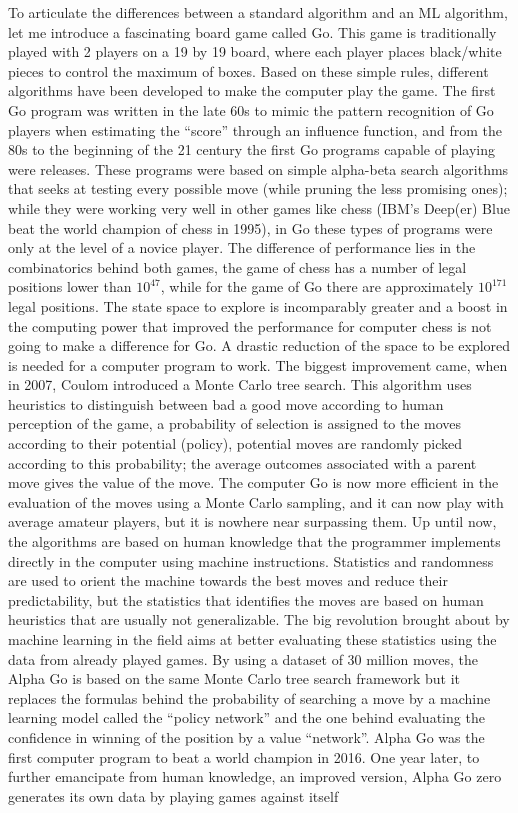 \documentclass[main]{subfiles}
\begin{document}
To articulate the differences between a standard algorithm and an ML algorithm, let me introduce a fascinating board game called Go. This game is traditionally played with 2 players on a 19 by 19 board, where each player places black/white pieces to control the maximum of boxes. Based on these simple rules, different algorithms have been developed to make the computer play the game. The first Go program was written in the late 60s to mimic the pattern recognition of Go players when estimating the ``score'' through an influence function,\autocite{zobrist1970feature} and from the 80s to the beginning of the 21 century the first Go programs capable of playing were releases. These programs were based on simple alpha-beta search algorithms that seeks at testing every possible move (while pruning the less promising ones); while they were working very well in other games like chess (IBM's Deep(er) Blue beat the world champion of chess in 1995), in Go these types of programs were only at the level of a novice player. The difference of performance lies in the combinatorics behind both games, the game of chess has a number of legal positions lower than $10^{47}$,\autocite{website_labelle} while for the game of Go there are approximately $10^{171}$ legal positions.\autocite{Tromp_2007,github_tromp_go} The state space to explore is incomparably greater and a boost in the computing power that improved the performance for computer chess is not going to make a difference for Go. A drastic reduction of the space to be explored is needed for a computer program to work. The biggest improvement came, when in 2007, Coulom introduced a Monte Carlo tree search.\autocite{Coulom_2007} This algorithm uses heuristics to distinguish between bad a good move according to human perception of the game, a probability of selection is assigned to the moves according to their potential (policy), potential moves are randomly picked according to this probability; the average outcomes associated with a parent move gives the value of the move. The computer Go is now more efficient in the evaluation of the moves using a Monte Carlo sampling, and it can now play with average amateur players, but it is nowhere near surpassing them. Up until now, the algorithms are based on human knowledge that the programmer implements directly in the computer using machine instructions. Statistics and randomness are used to orient the machine towards the best moves and reduce their predictability, but the statistics that identifies the moves are based on human heuristics that are usually not generalizable. The big revolution brought about by machine learning in the field aims at better evaluating these statistics using the data from already played games. By using a dataset of 30 million moves, the Alpha Go is based on the same Monte Carlo tree search framework but it replaces the formulas behind the probability of searching a move by a machine learning model called the ``policy network'' and the one behind evaluating the confidence in winning of the position by a value ``network''.\autocite{Silver_2016} Alpha Go was the first computer program to beat a world champion in 2016. One year later, to further emancipate from human knowledge, an improved version, Alpha Go zero generates its own data by playing games against itself 
\end{document}
